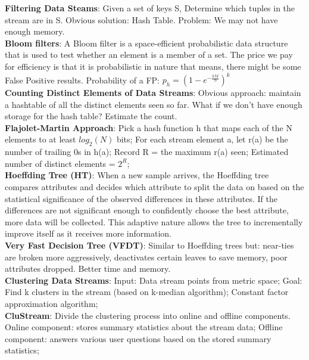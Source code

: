\documentclass[a4paper,7pt,landscape]{extarticle}
\begin{document}
\begin{multicols}{3}
\begin{boxA}
\textbf{Filtering Data Steams}: Given a set of keys S, Determine which tuples in the stream are in S. Obvious solution: Hash Table. Problem: We may not have enough memory.\\
\textbf{Bloom filters}: A Bloom filter is a space-efficient probabilistic data structure that is used to test whether an element is a member of a set. The price we pay for efficiency is that it is probabilistic in nature that means, there might be some False Positive results. Probability of a FP: $p_h = (1-e^{-\frac{kM}{N}})^k$\\
\textbf{Counting Distinct Elements of Data Streams}: Obvious approach: maintain a hashtable of all the distinct elements seen so far. What if we don't have enough storage for the hash table? Estimate the count.\\
\textbf{Flajolet-Martin Approach}: Pick a hash function h that maps each of the N elements to at least $log_2(N)$ bits; For each stream element a, let r(a) be the number of trailing 0s in h(a); Record R = the maximum r(a) seen; Estimated number of distinct elements = $2^R$;\\
\textbf{Hoeffding Tree (HT)}: When a new sample arrives, the Hoeffding tree compares attributes and decides which attribute to split the data on based on the statistical significance of the observed differences in these attributes. If the differences are not significant enough to confidently choose the best attribute, more data will be collected. This adaptive nature allows the tree to incrementally improve itself as it receives more information.\\
\textbf{Very Fast Decision Tree (VFDT)}: Similar to Hoeffding trees but: near-ties are broken more aggressively, deactivates certain leaves to save memory, poor attributes dropped. Better time and memory.\\
\textbf{Clustering Data Streams}: Input: Data stream points from metric space; Goal: Find k clusters in the stream (based on k-median algorithm); Constant factor approximation algorithm;\\
\textbf{CluStream}: Divide the clustering process into online and offline components. Online component: stores summary statistics about the stream data; Offline component: answers various user questions based on the stored summary statistics;
\end{boxA}


\end{multicols}
\end{document}
